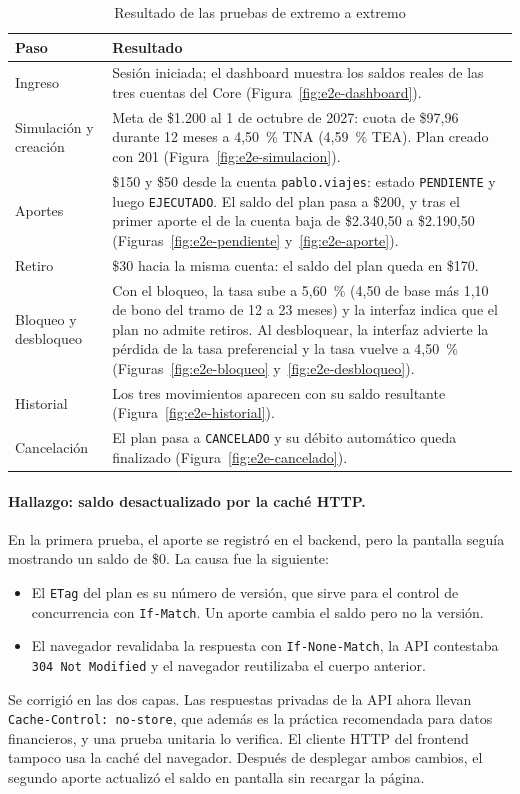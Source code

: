 \begin{table}[H]
\centering
\caption{Resultado de las pruebas de extremo a extremo}\label{tab:e2e}
\begin{tabularx}{\linewidth}{@{}>{\raggedright}p{3.6cm} X@{}}
\toprule
\textbf{Paso} & \textbf{Resultado} \\
\midrule
Ingreso & Sesión iniciada; el dashboard muestra los saldos reales de las tres cuentas del Core (Figura~\ref{fig:e2e-dashboard}). \\
Simulación y creación & Meta de \$1.200 al 1 de octubre de 2027: cuota de \$97,96 durante 12 meses a 4,50~\% TNA (4,59~\% TEA). Plan creado con 201 (Figura~\ref{fig:e2e-simulacion}). \\
Aportes & \$150 y \$50 desde la cuenta \texttt{pablo.viajes}: estado \texttt{PENDIENTE} y luego \texttt{EJECUTADO}. El saldo del plan pasa a \$200, y tras el primer aporte el de la cuenta baja de \$2.340,50 a \$2.190,50 (Figuras~\ref{fig:e2e-pendiente} y~\ref{fig:e2e-aporte}). \\
Retiro & \$30 hacia la misma cuenta: el saldo del plan queda en \$170. \\
Bloqueo y desbloqueo & Con el bloqueo, la tasa sube a 5,60~\% (4,50 de base más 1,10 de bono del tramo de 12 a 23 meses) y la interfaz indica que el plan no admite retiros. Al desbloquear, la interfaz advierte la pérdida de la tasa preferencial y la tasa vuelve a 4,50~\% (Figuras~\ref{fig:e2e-bloqueo} y~\ref{fig:e2e-desbloqueo}). \\
Historial & Los tres movimientos aparecen con su saldo resultante (Figura~\ref{fig:e2e-historial}). \\
Cancelación & El plan pasa a \texttt{CANCELADO} y su débito automático queda finalizado (Figura~\ref{fig:e2e-cancelado}). \\
\bottomrule
\end{tabularx}
\end{table}

\paragraph{Hallazgo: saldo desactualizado por la caché HTTP.} En la primera prueba, el aporte se registró en el backend, pero la pantalla seguía mostrando un saldo de \$0. La causa fue la siguiente:
\begin{itemize}
  \item El \texttt{ETag} del plan es su número de versión, que sirve para el control de concurrencia con \texttt{If-Match}. Un aporte cambia el saldo pero no la versión.
  \item El navegador revalidaba la respuesta con \texttt{If-None-Match}, la API contestaba \texttt{304 Not Modified} y el navegador reutilizaba el cuerpo anterior.
\end{itemize}
Se corrigió en las dos capas. Las respuestas privadas de la API ahora llevan \texttt{Cache-Control: no-store}, que además es la práctica recomendada para datos financieros, y una prueba unitaria lo verifica. El cliente HTTP del frontend tampoco usa la caché del navegador. Después de desplegar ambos cambios, el segundo aporte actualizó el saldo en pantalla sin recargar la página.

